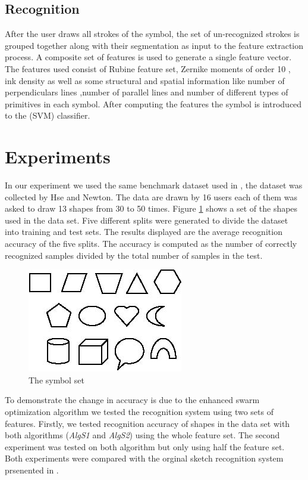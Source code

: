 \documentclass[10pt]{article}
\begin{document}
\subsection{Recognition}
\label{sec:Recognition}
After the user draws all strokes of the symbol, the set of un-recognized strokes is grouped together along with their segmentation as input to the feature extraction process. A composite set of features is used to generate a single feature vector. The features used consist of Rubine feature set,  Zernike moments of order 10 \cite{HeloiseBeautification}, ink density as well as some structural and spatial information like number of perpendiculars lines ,number of parallel lines and number of different types of primitives in each symbol. After computing the features the symbol is introduced to the (SVM) classifier. 

\cite{mypaper}  
\section{Experiments} 
\label{sec:Experiments}
In our experiment we used the same benchmark dataset used in \cite{mypaper}, the dataset was collected by Hse and Newton\cite{HeloiseBeautification}. The data are drawn by 16 users each of them was asked to draw 13 shapes from 30 to 50 times. Figure \ref{fig:symbolSet} shows a set of the shapes used in the data set. Five different splits were generated to divide the dataset into training and test sets. The results displayed are the average recognition accuracy of the five splits. The accuracy is computed as the number of correctly recognized samples divided by the total number of samples in the test.
	 
 \begin{figure}
  \centering 
 
		\includegraphics[scale=0.5]{symbolSet.PNG} 
		\caption[The Symbol Set] {The symbol set}   \label{fig:symbolSet}
	 \end{figure}
To demonstrate the change in accuracy is due to the enhanced swarm optimization algorithm we tested the recognition system using two sets of features. Firstly, we tested recognition accuracy of shapes in the data set with both algorithms (\textsl{AlgS1} and \textsl{AlgS2}) using the whole feature set. The second experiment was tested on both algorithm but only using half the feature set. Both experiments were compared with the orginal sketch recognition system prsenented in \cite{mypaper}. 
\end{document}
